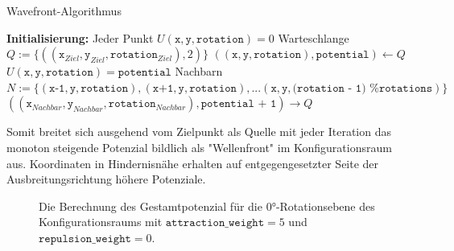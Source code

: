 \begin{algorithm}
\caption{Wavefront-Algorithmus}
\begin{algorithmic}[1]
    \State \textbf{Initialisierung:}
    \State \hspace{\algorithmicindent} Jeder Punkt $U(\texttt{x}, \texttt{y}, \texttt{rotation}) = 0$
    \State \hspace{\algorithmicindent} Warteschlange $Q := \{((\texttt{x}_{Ziel}, \texttt{y}_{Ziel}, \texttt{rotation}_{Ziel}), 2)\}$
	\vspace*{0.5cm}
        \State $((\texttt{x}, \texttt{y}, \texttt{rotation}), \texttt{potential}) \gets Q$
        \State $U(\texttt{x}, \texttt{y}, \texttt{rotation}) = \texttt{potential}$
        \State Nachbarn $N := \{(\texttt{x-1}, \texttt{y}, \texttt{rotation}), (\texttt{x+1}, \texttt{y}, \texttt{rotation}), ... (\texttt{x}, \texttt{y}, \texttt{(rotation - 1) \% rotations})\}$
                \State $((\texttt{x}_{Nachbar}, \texttt{y}_{Nachbar}, \texttt{rotation}_{Nachbar}), \texttt{potential + 1}) \rightarrow Q$
            \EndIf
        \EndFor
    \EndWhile
\end{algorithmic}
\end{algorithm}

Somit breitet sich ausgehend vom Zielpunkt als Quelle mit jeder Iteration das monoton steigende Potenzial bildlich als "Wellenfront" im Konfigurationsraum aus.
Koordinaten in Hindernisnähe erhalten auf entgegengesetzter Seite der Ausbreitungsrichtung höhere Potenziale.

\begin{figure}[h!]
	\centering
	\footnotesize
	\centerline{}
	\caption{Die Berechnung des Gestamtpotenzial für die $0$°-Rotationsebene des Konfigurationsraums mit $\texttt{attraction\_weight}=5$ und $\texttt{repulsion\_weight}=0$.}
\end{figure}


